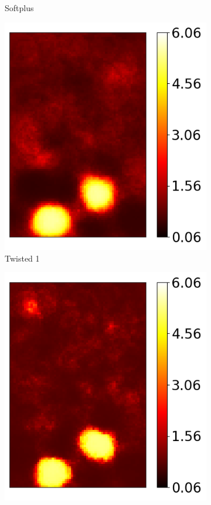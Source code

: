 \documentclass[12pt]{article}
\newcommand{\nhghaloesheight}{3.7cm}
\newcommand{\nhghaloeswidth}{0.19\linewidth}
\begin{document}
\begin{figure}[!h]
\begin{subfigure}[c]{\nhghaloeswidth}
    \caption{\label{fig:haloes_softplus} Softplus}
  \end{subfigure}
  \begin{subfigure}[c]{\nhghaloeswidth}
    \centering
    \includegraphics[totalheight=\nhghaloesheight]{Figures/softplus_halos_new/ex1_hot/mutanhshiftp50.png}
    \caption{\label{fig:haloes_tanhp50} Twisted 1}            
  \end{subfigure}
  \begin{subfigure}[c]{\nhghaloeswidth}
    \centering
    \includegraphics[totalheight=\nhghaloesheight]{Figures/softplus_halos_new/ex1_hot/mutanhshiftp25.png}

\end{subfigure}
\end{figure}
\end{document}
